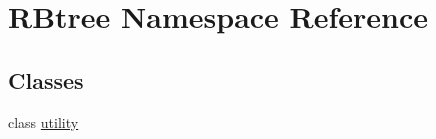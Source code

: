 \hypertarget{namespace_r_btree}{\section{R\-Btree Namespace Reference}
\label{namespace_r_btree}
}
\subsection*{Classes}
\begin{DoxyCompactItemize}
\item 
class \hyperlink{class_r_btree_1_1utility}{utility}
\end{DoxyCompactItemize}
